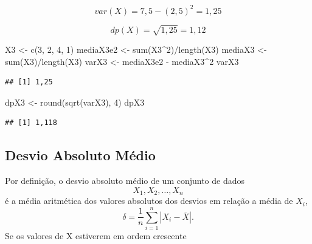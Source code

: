 \documentclass[
]{book}
\newenvironment{Shaded}{\begin{snugshade}}{\end{snugshade}}
\newcommand{\DecValTok}[1]{\textcolor[rgb]{0.00,0.00,0.81}{#1}}
\newcommand{\FunctionTok}[1]{\textcolor[rgb]{0.00,0.00,0.00}{#1}}
\newcommand{\NormalTok}[1]{#1}
\newcommand{\OtherTok}[1]{\textcolor[rgb]{0.56,0.35,0.01}{#1}}
\newcommand{\SpecialCharTok}[1]{\textcolor[rgb]{0.00,0.00,0.00}{#1}}
\begin{document}
\begin{equation*}
  var(X) = 7,5 - (2,5)^2 = 1,25
\end{equation*}

\begin{equation*}
  dp(X) = \sqrt{1,25} = 1,12
\end{equation*}

\begin{Shaded}
\begin{Highlighting}[]
\NormalTok{X3 }\OtherTok{\textless{}{-}} \FunctionTok{c}\NormalTok{(}\DecValTok{3}\NormalTok{, }\DecValTok{2}\NormalTok{, }\DecValTok{4}\NormalTok{, }\DecValTok{1}\NormalTok{)}
\NormalTok{mediaX3e2 }\OtherTok{\textless{}{-}} \FunctionTok{sum}\NormalTok{(X3}\SpecialCharTok{\^{}}\DecValTok{2}\NormalTok{)}\SpecialCharTok{/}\FunctionTok{length}\NormalTok{(X3)}
\NormalTok{mediaX3 }\OtherTok{\textless{}{-}} \FunctionTok{sum}\NormalTok{(X3)}\SpecialCharTok{/}\FunctionTok{length}\NormalTok{(X3)}
\NormalTok{varX3 }\OtherTok{\textless{}{-}}\NormalTok{ mediaX3e2 }\SpecialCharTok{{-}}\NormalTok{ mediaX3}\SpecialCharTok{\^{}}\DecValTok{2}
\NormalTok{varX3}
\end{Highlighting}
\end{Shaded}

\begin{verbatim}
## [1] 1,25
\end{verbatim}

\begin{Shaded}
\begin{Highlighting}[]
\NormalTok{dpX3 }\OtherTok{\textless{}{-}} \FunctionTok{round}\NormalTok{(}\FunctionTok{sqrt}\NormalTok{(varX3), }\DecValTok{4}\NormalTok{)}
\NormalTok{dpX3}
\end{Highlighting}
\end{Shaded}

\begin{verbatim}
## [1] 1,118
\end{verbatim}

\hypertarget{desvio-absoluto-muxe9dio}{%
\subsection{Desvio Absoluto Médio}\label{desvio-absoluto-muxe9dio}}

Por definição, o desvio absoluto médio de um conjunto de dados
\[
  X_1, X_2, \ldots, X_n
\]
é a média aritmética dos valores absolutos dos desvios em relação a média de \(X_i\),
\[
  \delta = \dfrac{1}{n} \sum_{i=1}^{n} \left| X_i - \overline{X} \right|.
  \label{eq:DesvioAbsolutoMedio}
\]
Se os valores de X estiverem em ordem crescente
\end{document}
